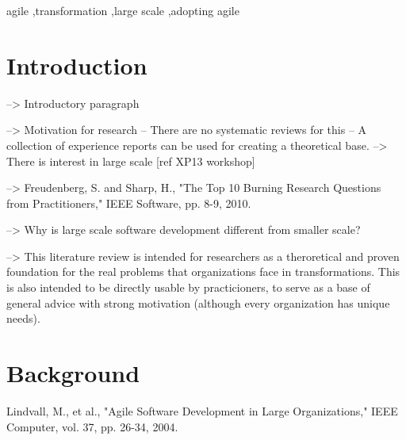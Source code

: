 \documentclass[preprint,authoryear,12pt]{elsarticle}
\begin{document}
\begin{frontmatter}
\begin{abstract}
\end{abstract}

\begin{keyword}

agile \sep transformation \sep large scale \sep adopting agile

\end{keyword}

\end{frontmatter}




\section{Introduction}

--> Introductory paragraph

--> Motivation for research
-- There are no systematic reviews for this
-- A collection of experience reports can be used for creating a theoretical
   base.
--> There is interest in large scale [ref XP13 workshop]

--> Freudenberg, S. and Sharp, H., "The Top 10 Burning Research Questions from
    Practitioners," IEEE Software, pp. 8-9, 2010.

--> Why is large scale software development different from smaller scale?

--> This literature review is intended for researchers as a theroretical
   and proven foundation for the real problems that organizations face in
   transformations.
   This is also intended to be directly usable by practicioners, to serve as a
   base of general advice with strong motivation (although every organization
   has unique needs).


\section{Background}
\label{sec:background}

Lindvall, M., et al., "Agile Software Development in Large Organizations,"
IEEE Computer, vol. 37, pp. 26-34, 2004.
\end{document}

